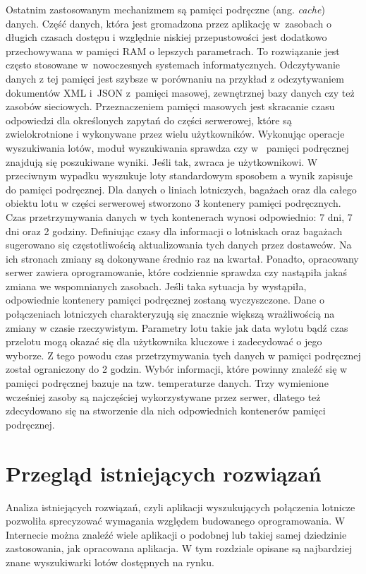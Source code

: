 \documentclass[12pt, twoside]{report}
\begin{document}
Ostatnim zastosowanym mechanizmem są pamięci podręczne (ang. \emph{cache}) danych. Część danych, która jest gromadzona przez aplikację w~zasobach o długich czasach dostępu i względnie niskiej przepustowości jest dodatkowo przechowywana w pamięci RAM o lepszych parametrach\cite{ehcache}. To rozwiązanie jest często stosowane w~nowoczesnych systemach informatycznych. Odczytywanie danych z tej pamięci jest szybsze w porównaniu na przykład z odczytywaniem dokumentów XML i~JSON z~pamięci masowej, zewnętrznej bazy danych czy też zasobów sieciowych. Przeznaczeniem pamięci masowych jest skracanie czasu odpowiedzi dla określonych zapytań do części serwerowej, które są zwielokrotnione i wykonywane przez wielu użytkowników. Wykonując operacje wyszukiwania lotów, moduł wyszukiwania sprawdza czy w  ~pamięci podręcznej znajdują się poszukiwane wyniki. Jeśli tak, zwraca je użytkownikowi. W przeciwnym wypadku  wyszukuje loty standardowym sposobem a wynik zapisuje do pamięci podręcznej. Dla danych o liniach lotniczych, bagażach oraz dla całego obiektu lotu w części serwerowej stworzono 3 kontenery pamięci podręcznych. Czas przetrzymywania danych w tych kontenerach wynosi odpowiednio: 7 dni, 7 dni oraz 2 godziny. Definiując czasy dla informacji o lotniskach oraz bagażach sugerowano się częstotliwością aktualizowania tych danych przez dostawców. Na ich stronach zmiany są dokonywane średnio raz na kwartał. Ponadto, opracowany serwer zawiera oprogramowanie, które codziennie sprawdza czy nastąpiła jakaś zmiana we wspomnianych zasobach. Jeśli taka sytuacja by wystąpiła, odpowiednie kontenery pamięci podręcznej zostaną wyczyszczone. Dane o połączeniach lotniczych charakteryzują się znacznie większą wrażliwością na zmiany w czasie rzeczywistym. Parametry lotu takie jak data wylotu bądź czas przelotu mogą okazać się dla użytkownika kluczowe i zadecydować o jego wyborze. Z tego powodu czas przetrzymywania tych danych w pamięci podręcznej został ograniczony do 2 godzin. 
Wybór informacji, które powinny znaleźć się w pamięci podręcznej bazuje na tzw. temperaturze danych. Trzy wymienione wcześniej zasoby są najczęściej wykorzystywane przez serwer, dlatego też zdecydowano się na stworzenie dla nich odpowiednich kontenerów pamięci podręcznej.

\chapter{Przegląd istniejących rozwiązań}
Analiza istniejących rozwiązań, czyli aplikacji wyszukujących połączenia lotnicze pozwoliła sprecyzować wymagania względem budowanego oprogramowania. W Internecie można znaleźć wiele aplikacji o podobnej lub takiej samej dziedzinie zastosowania, jak opracowana aplikacja. W tym rozdziale opisane są najbardziej znane wyszukiwarki lotów dostępnych na rynku. 
\end{document}
